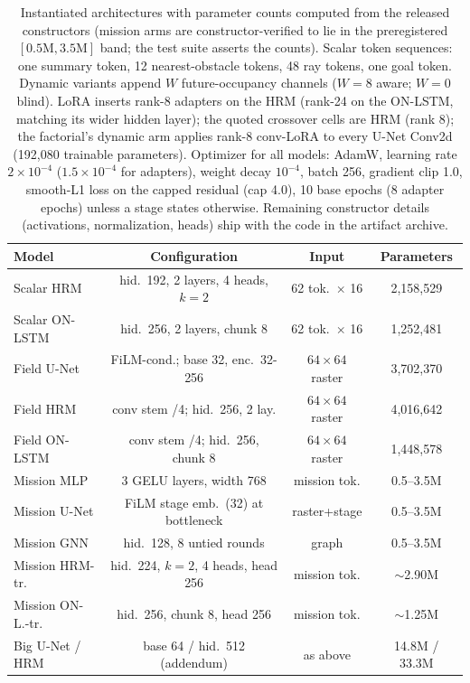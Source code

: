\documentclass[letterpaper]{article} %
\begin{document}
\begin{table}[t]
\centering
\small
\setlength{\tabcolsep}{1.6pt}
\begin{tabular}{@{}lccc@{}}
\toprule
Model & Configuration & Input & Parameters \\
\midrule
Scalar HRM & hid.\ 192, 2 layers, 4 heads, $k{=}2$ & 62 tok.\ $\times$ 16 & 2{,}158{,}529 \\
Scalar ON-LSTM & hid.\ 256, 2 layers, chunk 8 & 62 tok.\ $\times$ 16 & 1{,}252{,}481 \\
Field U-Net & FiLM-cond.; base 32, enc.\ 32-256 & $64{\times}64$ raster & 3{,}702{,}370 \\
Field HRM & conv stem /4; hid.\ 256, 2 lay. & $64{\times}64$ raster & 4{,}016{,}642 \\
Field ON-LSTM & conv stem /4; hid.\ 256, chunk 8 & $64{\times}64$ raster & 1{,}448{,}578 \\
\midrule
Mission MLP & 3 GELU layers, width 768 & mission tok. & 0.5--3.5M \\
Mission U-Net & FiLM stage emb.\ (32) at bottleneck & raster+stage & 0.5--3.5M \\
Mission GNN & hid.\ 128, 8 untied rounds & graph & 0.5--3.5M \\
Mission HRM-tr. & hid.\ 224, $k{=}2$, 4 heads, head 256 & mission tok. & $\sim$2.90M \\
Mission ON-L.-tr. & hid.\ 256, chunk 8, head 256 & mission tok. & $\sim$1.25M \\
Big U-Net / HRM & base 64 / hid.\ 512 (addendum) & as above & 14.8M / 33.3M \\
\bottomrule
\end{tabular}
\caption{Instantiated architectures with parameter counts computed from the released constructors (mission arms are constructor-verified to lie in the preregistered $[0.5\mathrm{M}, 3.5\mathrm{M}]$ band; the test suite asserts the counts). Scalar token sequences: one summary token, 12 nearest-obstacle tokens, 48 ray tokens, one goal token. Dynamic variants append $W$ future-occupancy channels ($W{=}8$ aware; $W{=}0$ blind). LoRA inserts rank-8 adapters on the HRM (rank-24 on the ON-LSTM, matching its wider hidden layer); the quoted crossover cells are HRM (rank 8); the factorial's dynamic arm applies rank-8 conv-LoRA to every U-Net Conv2d (192{,}080 trainable parameters). Optimizer for all models: AdamW, learning rate $2{\times}10^{-4}$ ($1.5{\times}10^{-4}$ for adapters), weight decay $10^{-4}$, batch 256, gradient clip 1.0, smooth-L1 loss on the capped residual (cap 4.0), 10 base epochs (8 adapter epochs) unless a stage states otherwise. Remaining constructor details (activations, normalization, heads) ship with the code in the artifact archive.}
\label{tab:archspec}
\end{table}
\end{document}
